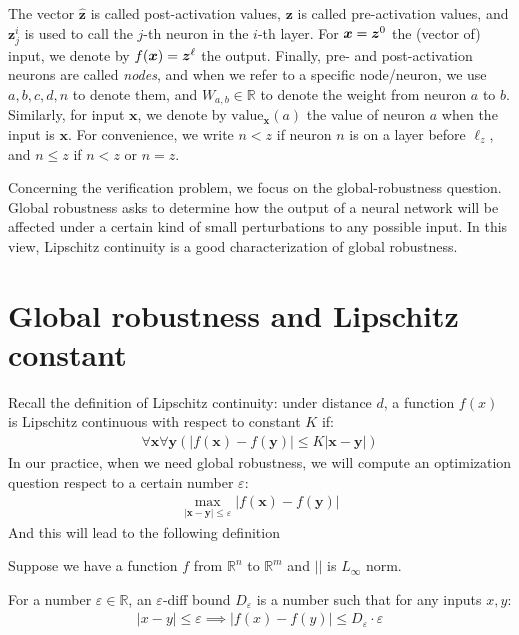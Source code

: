 \documentclass{llncs}
\newcommand{\val}{{\textrm{value}}}
\begin{document}
	The vector $\hat{\boldsymbol{z}}$ is called post-activation values, 
	$\boldsymbol{z}$ is called pre-activation values, 
	and $\boldsymbol{z}^{i}_j$ is used to call the $j$-th neuron in the $i$-th layer. 
	For $\boldsymbol{x}={\bm{z}}^0$ the (vector of) input, we denote by $f(\boldsymbol{x})={\bm{z}}^\ell$ the output. Finally, pre- and post-activation neurons are called \emph{nodes}, and when we refer to a specific node/neuron, we use $a,b,c,d,n$ to denote them, and $W_{a,b} \in \mathbb{R}$ to denote the weight from neuron $a$ to $b$. Similarly, for input $\boldsymbol{x}$, we denote by $\val_{\boldsymbol{x}}(a)$ the value of neuron $a$ when the input is $\boldsymbol{x}$.	For convenience, we write $n < z$ if neuron $n$ is on a layer before $\ell_z$, and $n \leq z$ if $n< z$ or $n=z$.
	
	Concerning the verification problem, we focus on the global-robustness question. Global robustness asks to determine how the output of a neural network will be affected under a certain kind of small perturbations to any possible input. In this view, Lipschitz continuity is a good characterization of global robustness.
	
	
	
	
	\section{Global robustness and Lipschitz constant}
	
	
	Recall the definition of Lipschitz continuity:
	under distance $d$, a function $f(x)$ is Lipschitz continuous with respect to constant $K$ if:
	\begin{align*}
		\forall \boldsymbol{x} \forall\boldsymbol{y} (|f(\boldsymbol{x}) -f(\boldsymbol{y}) |\leq K|\boldsymbol{x}-\boldsymbol{y}|)
	\end{align*} 
	In our practice, when we need global robustness, we will compute an optimization question respect to a certain number $\varepsilon$:	\begin{align}\label{global_robustness}
		\max_{|\boldsymbol{x}-\boldsymbol{y}| \leq \varepsilon} |f(\boldsymbol{x}) -f(\boldsymbol{y}) |
	\end{align} And this will lead to the following definition

		\begin{definition}
		Suppose we have a function $f$ from $\mathbb{R}^n$ to $\mathbb{R}^m$ and $||$ is $L_\infty$ norm. 
		
		For a number $\varepsilon\in\mathbb{R}$, an $\varepsilon$-diff bound $D_\varepsilon$ is a number such that for any inputs $x,y$: \begin{align*}
			|x-y|\leq \varepsilon \implies |f(x)-f(y)| \leq D_\varepsilon \cdot \varepsilon
		\end{align*}
		
	\end{definition}
	
\end{document}
